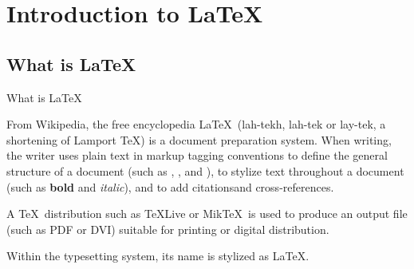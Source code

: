 \section{Introduction to \LaTeX}

\subsection{What is \LaTeX}

\begin{frame}{What is \LaTeX}
    \begin{block}{From Wikipedia, the free encyclopedia\footnotemark[1]}
        \LaTeX\ (lah-tekh, lah-tek or lay-tek, a shortening of Lamport \TeX) is a document preparation system. When writing, the writer uses plain text in markup tagging conventions to define the general structure of a document (such as , , and ), to stylize text throughout a document (such as \textbf{bold} and \textit{italic}), and to add citations\footnotemark[1] and cross-references. \medskip

        \pause

        A \TeX\ distribution such as \TeX Live or Mik\TeX\ is used to produce an output file (such as PDF or DVI) suitable for printing or digital distribution. \medskip

        \pause

        Within the typesetting system, its name is stylized as \LaTeX.
    \end{block}


\end{frame}

